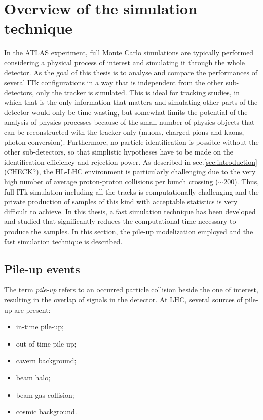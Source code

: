 \documentclass[a4paper,twoside,12pt]{article}
\begin{document}
\newpage

\section{Overview of the simulation technique}\label{sec:simulation}
In the ATLAS experiment, full Monte Carlo simulations are typically performed considering 
a physical process of interest and simulating it through the whole detector. As the goal of this
thesis is to analyse and compare the performances of several ITk configurations in a way that
is independent from the other sub-detectors, only the tracker is simulated. This is 
ideal for tracking studies, in which that is the only information that matters and simulating
other parts of the detector would only be time wasting, but
somewhat 
limits the potential of the analysis of physics processes because of the small number of physics objects that can be reconstructed with the tracker only (muons, charged pions and kaons, photon conversion). Furthermore, no particle identification is possible without the other sub-detectors, so that 
simplistic hypotheses have to be made on the identification efficiency and rejection power.
As described in sec.\ref{sec:introduction} (CHECK?), the HL-LHC environment is particularly
challenging due to the very high number of average proton-proton collisions per bunch crossing ($\sim 200$). Thus, full ITk simulation including all the tracks is computationally challenging 
and the private production of samples of this kind with acceptable statistics is very difficult
to achieve. In this thesis, a fast simulation technique has been developed and studied that
significantly reduces the computational time necessary to produce the samples. In this section,
the pile-up modelization employed and the fast simulation technique is described.


\subsection{Pile-up events}
The term \textit{pile-up} refers to an occurred particle collision beside the one of interest, resulting in 
the overlap of signals in the detector.
At LHC, several sources of pile-up are present:

\begin{itemize}
\item in-time pile-up;
\item out-of-time pile-up;
\item cavern background;
\item beam halo;
\item beam-gas collision;
\item cosmic background.
\end{itemize}
\end{document}
